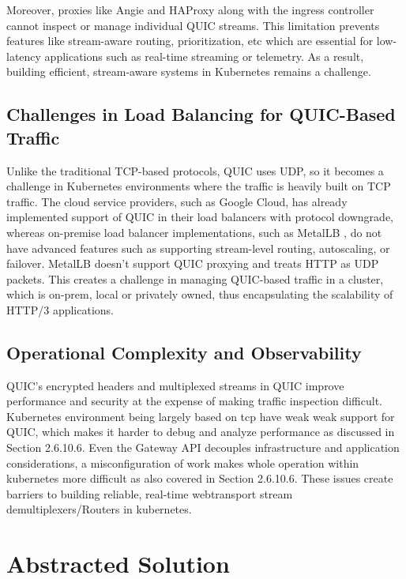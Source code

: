 Moreover, proxies like Angie \cite{angie-docs} and HAProxy \cite{haproxy-docs} along with the ingress controller cannot inspect or manage individual QUIC streams. This limitation prevents features like stream-aware routing, prioritization, etc which are essential for low-latency applications such as real-time streaming or telemetry. As a result, building efficient, stream-aware systems in Kubernetes remains a challenge.

\subsection{Challenges in Load Balancing for QUIC-Based Traffic}
Unlike the traditional TCP-based protocols, QUIC uses UDP, so it becomes a challenge in Kubernetes environments where the traffic is heavily built on TCP traffic. The cloud service providers, such as Google Cloud, has already implemented support of QUIC in their load balancers with protocol downgrade, whereas on-premise load balancer implementations, such as MetalLB \cite{metallb-docs}, do not have advanced features such as supporting stream-level routing, autoscaling, or failover. MetalLB doesn't support QUIC proxying and treats HTTP as UDP packets. This creates a challenge in managing QUIC-based traffic in a cluster, which is on-prem, local or privately owned, thus encapsulating the scalability of HTTP/3 applications.


\subsection{Operational Complexity and Observability}

QUIC’s encrypted headers and multiplexed streams in QUIC improve performance and security at the expense of making traffic inspection difficult. Kubernetes environment being largely based on tcp have weak weak support for QUIC, which makes it harder to debug and analyze performance as discussed in Section 2.6.10.6. Even the Gateway API decouples infrastructure and application considerations, a misconfiguration of work makes whole operation within kubernetes more difficult as also covered in Section 2.6.10.6. These issues create barriers to building reliable, real-time webtransport stream demultiplexers/Routers in kubernetes.

\section{Abstracted Solution}


